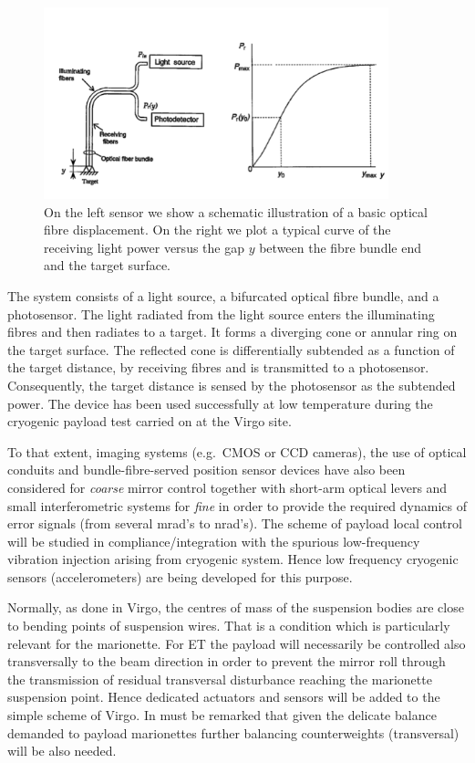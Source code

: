 \begin{figure}[h]
\begin{center}
\includegraphics[width=10cm]{Sec_Suspensions/Figures/Fiber_tot.pdf}
\caption{On the left sensor we show a schematic illustration of a basic optical fibre displacement. On the right we plot a typical curve of the receiving light power versus the gap $y$ between the fibre bundle end and the target surface.}
\label{fig:fiber_bundle}
\end{center}
\end{figure}

\noindent 
The system consists of a light source, a bifurcated optical fibre bundle, and a photosensor. The light radiated from the light source enters the illuminating fibres and then radiates to a target. It forms a diverging cone or annular ring on the target surface. 
The reflected cone is differentially subtended as a function of the target distance, by receiving fibres 
and is transmitted to a photosensor. Consequently, the target distance is sensed by the photosensor as the subtended power. 
The device has been used successfully at low temperature during the cryogenic payload test carried on at the Virgo site.

To that extent, imaging systems (e.g.\ CMOS or CCD cameras), the use of optical conduits and bundle-fibre-served position sensor devices have also been considered for \emph{coarse} mirror control together with short-arm optical levers and small interferometric systems for \emph{fine} in order to provide the required dynamics of error signals (from several mrad's to nrad's).  The scheme of payload local control will be studied in compliance/integration with the spurious low-frequency vibration injection arising from cryogenic system. Hence low frequency cryogenic sensors (accelerometers) are being developed for this purpose.

Normally, as done in Virgo, the centres of mass of the suspension bodies are close to bending points of suspension wires. That is a condition which is particularly relevant for the marionette.  For ET the payload  will necessarily be controlled also transversally to the beam direction in order to prevent the mirror roll through the transmission of residual transversal disturbance reaching the marionette suspension point. Hence dedicated actuators and sensors will be added to the simple scheme of Virgo. In must be remarked that given the delicate balance demanded to payload  marionettes further balancing counterweights (transversal) will be also needed.

